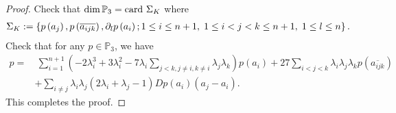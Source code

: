 \documentclass[11pt,a4paper,center,notitlepage]{article}
\numberwithin{equation}{section}
\begin{document}
\begin{proof}
Check that $\dim \mathbb{P}_3 ={\rm card}\ \Sigma _K$ where
\begin{align}
{\Sigma _K}: = \left\{ {p\left( {{a_j}} \right),p\left( {\overline {{a_{ijk}}} } \right),{\partial _l}p\left( {{a_i}} \right);1 \le i \le n + 1, \hspace{1mm}1 \le i < j < k \le n + 1, \hspace{1mm}1 \le l \le n} \right\}.
\end{align}
Check that for any $p\in \mathbb{P}_3$, we have
\begin{align}
p =&\ \sum\limits_{i = 1}^{n + 1} {\left( { - 2\lambda _i^3 + 3\lambda _i^2 - 7{\lambda _i}\sum\limits_{j < k,j \ne i,k \ne i} {{\lambda _j}{\lambda _k}} } \right)p\left( {{a_i}} \right)}  + 27\sum\limits_{i < j < k} {{\lambda _i}{\lambda _j}{\lambda _k}p\left( {\overline {{a_{ijk}}} } \right)} \\
& + \sum\limits_{i \ne j} {{\lambda _i}{\lambda _j}\left( {2{\lambda _i} + {\lambda _j} - 1} \right)Dp\left( {{a_i}} \right)\left( {{a_j} - {a_i}} \right)} .
\end{align}
This completes the proof.
\end{proof}
\end{document}
